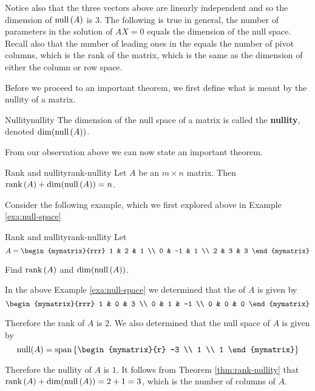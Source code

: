 Notice also that the three vectors above are linearly independent and
so the dimension of $\mbox{\rm null} \left(A\right) $ is 3. The following is
true in general, the number of parameters in the solution of $AX=0$
equals the dimension of the null space. Recall also that the number of
leading ones in the {\rref} equals the number of pivot columns, which is
the rank of the matrix, which is the same as the dimension of either
the column or row space.

Before we proceed to an important theorem, we first define what is meant by the nullity of a matrix. 

\begin{definition}{Nullity}{nullity}
The dimension of the null space of a matrix is called the \textbf{nullity}, denoted $\dim( \mbox{\rm null}\left(A\right))$.
\end{definition}

From our observation above we can now state an important theorem.

\begin{theorem}{Rank and nullity}{rank-nullity}
Let $A$ be an $m\times n$ matrix. Then $\mbox{\rm rank}\left(A\right) + \dim( \mbox{\rm null}\left(A\right)) =n$. 
\end{theorem}

Consider the following example, which we first explored above in Example \ref{exa:null-space}

\begin{example}{Rank and nullity}{rank-nullity}
Let
\begin{equation*}
A=\begin{mymatrix}{rrr}
1 & 2 & 1 \\
0 & -1 & 1 \\
2 & 3 & 3
\end{mymatrix} 
\end{equation*}

Find $\mbox{\rm rank}\left(A\right)$ and $\dim( \mbox{\rm null}\left(A\right))$. 
\end{example}

\medskip
\begin{solution}
In the above Example \ref{exa:null-space} we determined that the {\rref} of $A$ is given by 
\[
\begin{mymatrix}{rrr}
1 & 0 & 3 \\ 
0 & 1 & -1  \\
0 & 0 & 0 
\end{mymatrix}
\]

Therefore the rank of $A$ is $2$. We also determined that the null space of $A$ is given by 
\[
\func{null} (A) = \func{span} \set{\begin{mymatrix}{r}
-3 \\ 
1 \\ 
1
\end{mymatrix}
}
\]

Therefore the nullity of $A$ is $1$. It follows from Theorem \ref{thm:rank-nullity} that $\mbox{\rm rank}\left(A\right) + \dim( \mbox{\rm null}\left(A\right)) = 2 + 1 = 3$, which is the number of columns of $A$.
\end{solution} 


